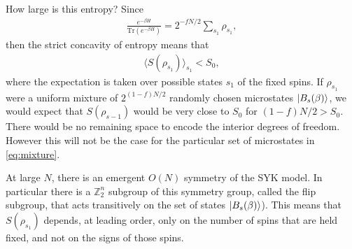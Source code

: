 \documentclass[11pt,a4paper]{article}
\newcommand{\Tr}{\mathrm{Tr}}
\begin{document}
How large is this entropy? Since 
\begin{align}
\frac{e^{-\beta H}}{\Tr(e^{-\beta H})} = 2^{-f N/2}\sum_{s_1} \rho_{s_1},
\end{align}
then the strict concavity of entropy means that 
\begin{align}
\langle S(\rho_{s_1}) \rangle_{s_1} < S_0,
\end{align}
where the expectation is taken over possible states $s_1$ of the fixed spins. If $\rho_{s_1}$ were a uniform mixture of $2^{(1-f)N/2}$ randomly chosen microstates $\ket{B_s(\beta)}$, we would expect that $S(\rho_{s-1})$ would be very close to $S_0$ for $(1-f)N/2 > S_0$. There would be no remaining space to encode the interior degrees of freedom. However this will not be the case for the particular set of microstates in \eqref{eq:mixture}. 

At large $N$, there is an emergent $O(N)$ symmetry of the SYK model. In particular there is a $\mathbb{Z}_2^n$ subgroup of this symmetry group, called the flip subgroup, that acts transitively on the set of states $\ket{B_s(\beta)}$). This means that $S(\rho_{s_1})$ depends, at leading order, only on the number of spins that are held fixed, and not on the signs of those spins.
\end{document}
